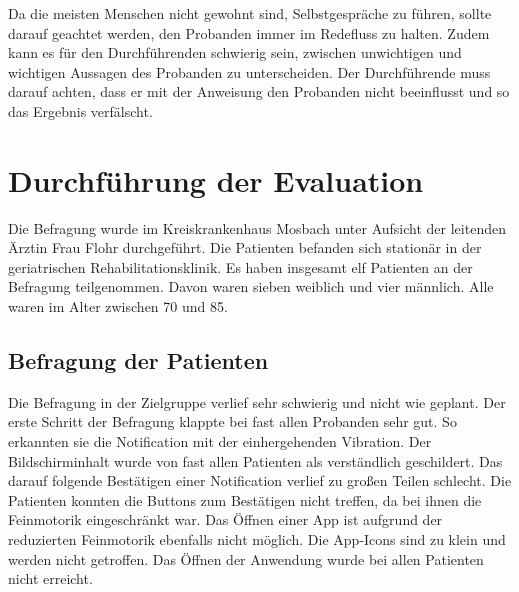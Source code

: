 Da die meisten Menschen nicht gewohnt sind, Selbstgespräche zu führen, sollte darauf geachtet werden, den Probanden immer im Redefluss zu halten. Zudem kann es für den Durchführenden schwierig sein, zwischen unwichtigen und wichtigen Aussagen des Probanden zu unterscheiden. Der Durchführende muss darauf achten, dass er mit der Anweisung den Probanden nicht beeinflusst und so das Ergebnis verfälscht.

\section{Durchführung der Evaluation}
Die Befragung wurde im Kreiskrankenhaus Mosbach unter Aufsicht der leitenden Ärztin Frau Flohr durchgeführt. Die Patienten befanden sich stationär in der geriatrischen Rehabilitationsklinik. Es haben insgesamt elf Patienten  an der Befragung teilgenommen. Davon waren sieben weiblich und vier männlich. Alle waren im Alter zwischen 70 und 85. 

\subsection{Befragung der Patienten}

Die Befragung in der Zielgruppe verlief sehr schwierig und nicht wie geplant.
Der erste Schritt der Befragung klappte bei fast allen Probanden sehr gut. So erkannten sie die Notification mit der einhergehenden Vibration. Der Bildschirminhalt wurde von fast allen Patienten als verständlich geschildert. Das darauf folgende Bestätigen einer Notification verlief zu großen Teilen schlecht. Die Patienten konnten die Buttons zum Bestätigen nicht treffen, da bei ihnen die Feinmotorik eingeschränkt war.
Das Öffnen einer App ist aufgrund der reduzierten Feinmotorik ebenfalls nicht möglich. Die App-Icons sind zu klein und werden nicht getroffen. Das Öffnen der Anwendung wurde bei allen Patienten nicht erreicht.
